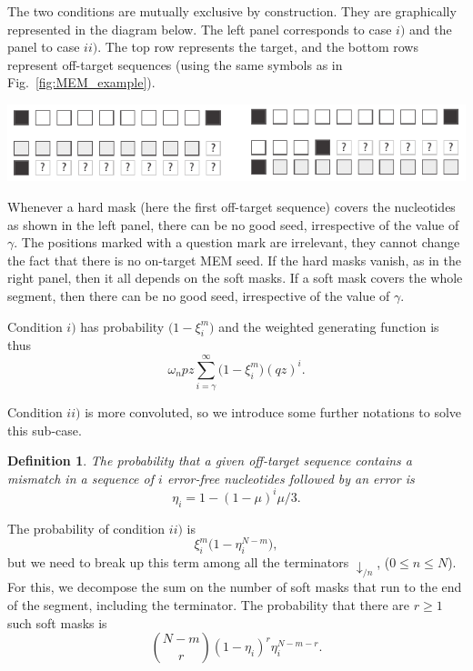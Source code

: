 \documentclass{article}
\newtheorem{definition}{Definition}
\newenvironment{inset}
{\vspace{0.5\baselineskip}\begin{center}}
{\end{center}\vspace{0.5\baselineskip}}
\begin{document}
The two conditions are mutually exclusive by construction. They are
graphically represented in the diagram below. The left panel corresponds
to case $i)$ and the panel to case $ii)$. The top row represents the
target, and the bottom rows represent off-target sequences (using the same
symbols as in Fig.~\ref{fig:MEM_example}).
\begin{inset}
\includegraphics{masks.pdf}
\end{inset}

Whenever a hard mask (here the first off-target sequence) covers the
nucleotides as shown in the left panel, there can be no good seed,
irrespective of the value of $\gamma$. The positions marked with a
question mark are irrelevant, they cannot change the fact that there is no
on-target MEM seed. If the hard masks vanish, as in the right panel, then
it all depends on the soft masks. If a soft mask covers the whole segment,
then there can be no good seed, irrespective of the value of $\gamma$.

Condition $i)$ has probability $\big(1 - \xi_i^m \big)$ and the
weighted generating function is thus
\begin{equation*}
\omega_n pz \sum_{i=\gamma}^\infty \Big(1 - \xi_i^m \Big) (qz)^i.
\end{equation*}

Condition $ii)$ is more convoluted, so we introduce some further
notations to solve this sub-case.
\begin{definition}
The probability that a given off-target sequence contains a mismatch in a
sequence of $i$ error-free nucleotides followed by an error is
\begin{equation}
\label{eq:eta}
\eta_i = 1-(1-\mu)^i\mu/3.
\end{equation}
\end{definition}

The probability of condition $ii)$ is
\begin{equation*}
\xi_i^m \Big(1 - \eta_i^{N-m} \Big),
\end{equation*}
but we need to break up this term among all the terminators
$\downarrow_{/n}$, ($0 \leq n \leq N$). For this, we decompose the sum on
the number of soft masks that run to the end of the segment, including the
terminator. The probability that there are $r \geq 1$ such soft masks is
\begin{equation*}
{N-m \choose r} (1 - \eta_i)^r \eta_i^{N-m-r}.
\end{equation*}
\end{document}
